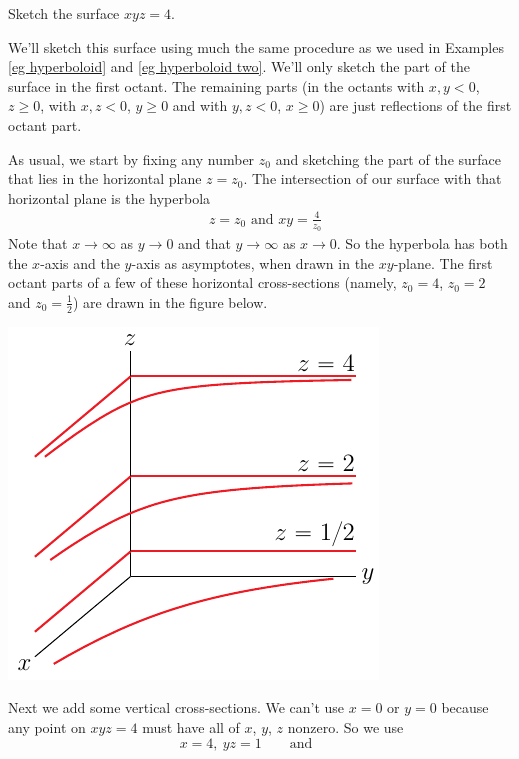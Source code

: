 \bigskip
\begin{eg}[$xyz=4$]\label{eg xyz}
\medskip
Sketch the surface $xyz=4$. 

\soln
We'll sketch this surface using much the same procedure as we used
in Examples \ref{eg hyperboloid} and \ref{eg hyperboloid two}.
We'll only sketch the part of the surface in the first octant. The
remaining parts (in the octants with $x,y<0$, $z\ge 0$, with
$x,z<0$, $y\ge 0$ and with $y,z<0$, $x\ge0$) are just reflections of
the first octant part.

As usual, we start by fixing any number $z_0$ 
and sketching the part of the surface that lies in the horizontal 
plane $z=z_0$. The intersection of our surface with that horizontal plane is 
the hyperbola
\begin{align*}
&z=z_0\text{\  \ and\ \ }xy=\frac{4}{z_0}
\end{align*}
Note that $x\rightarrow\infty$ as $y\rightarrow 0$ and that 
$y\rightarrow\infty$ as $x\rightarrow 0$. So the hyperbola 
has both the $x$-axis and the $y$-axis as asymptotes, when drawn in the $xy$-plane. 
The first octant parts of a few of these horizontal cross-sections 
(namely, $z_0=4$, $z_0=2$ and $z_0=\frac{1}{2}$)
are drawn in the figure below.
\begin{efig}
\begin{center}
   \includegraphics{seatB.pdf}
\end{center}
\end{efig}
Next we add some vertical cross-sections.
We can't use $x=0$ or $y=0$ because any point on $xyz=4$ 
must have all of $x$, $y$, $z$ nonzero. So we use
\begin{equation*}
x=4,\ yz=1\qquad\text{and}\qquad

\end{equation*}
\end{eg}
